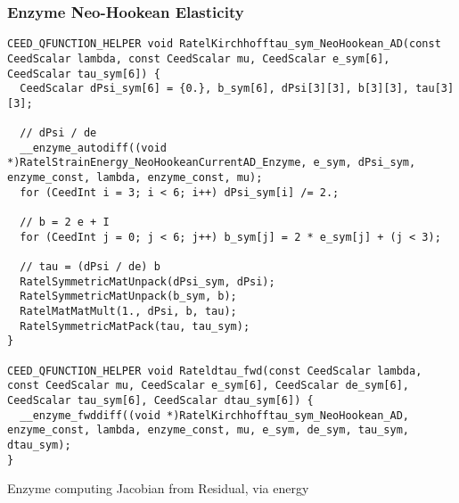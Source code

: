 \documentclass{beamer}
\begin{document}
\begin{frame}[fragile]
\begin{center}
\frametitle{Enzyme Neo-Hookean Elasticity}

{\tiny
\begin{lstlisting}[style=boxedC]
CEED_QFUNCTION_HELPER void RatelKirchhofftau_sym_NeoHookean_AD(const CeedScalar lambda, const CeedScalar mu, CeedScalar e_sym[6], CeedScalar tau_sym[6]) {
  CeedScalar dPsi_sym[6] = {0.}, b_sym[6], dPsi[3][3], b[3][3], tau[3][3];

  // dPsi / de
  __enzyme_autodiff((void *)RatelStrainEnergy_NeoHookeanCurrentAD_Enzyme, e_sym, dPsi_sym, enzyme_const, lambda, enzyme_const, mu);
  for (CeedInt i = 3; i < 6; i++) dPsi_sym[i] /= 2.;

  // b = 2 e + I
  for (CeedInt j = 0; j < 6; j++) b_sym[j] = 2 * e_sym[j] + (j < 3);

  // tau = (dPsi / de) b
  RatelSymmetricMatUnpack(dPsi_sym, dPsi);
  RatelSymmetricMatUnpack(b_sym, b);
  RatelMatMatMult(1., dPsi, b, tau);
  RatelSymmetricMatPack(tau, tau_sym);
}

CEED_QFUNCTION_HELPER void Rateldtau_fwd(const CeedScalar lambda, const CeedScalar mu, CeedScalar e_sym[6], CeedScalar de_sym[6], CeedScalar tau_sym[6], CeedScalar dtau_sym[6]) {
  __enzyme_fwddiff((void *)RatelKirchhofftau_sym_NeoHookean_AD, enzyme_const, lambda, enzyme_const, mu, e_sym, de_sym, tau_sym, dtau_sym);
}

\end{lstlisting}
}

Enzyme computing Jacobian from Residual, via energy\\

\end{center}
\end{frame}

\end{document}
